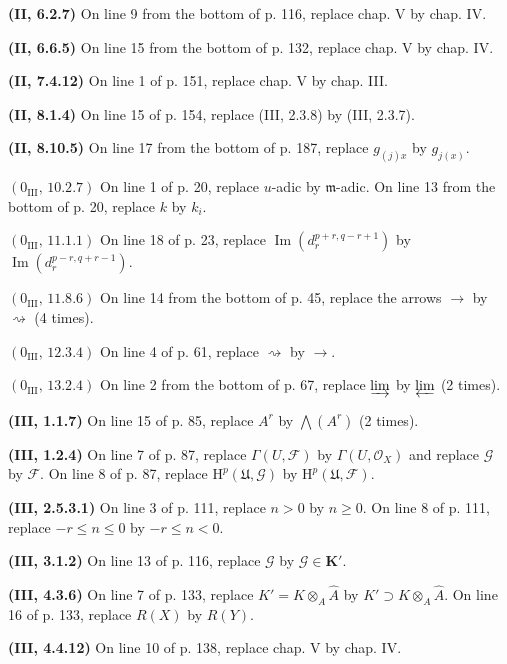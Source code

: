 \documentclass[10pt,oneside]{book}
\newcommand{\sh}[1]{\mathscr{#1}}
\newcommand{\HH}{\mathrm H}
\begin{document}
\noindent\textbf{(II, 6.2.7)} On line 9 from the bottom of p. 116, replace
chap. V by chap. IV.

\noindent\textbf{(II, 6.6.5)} On line 15 from the bottom of p. 132, replace
chap. V by chap. IV.

\noindent\textbf{(II, 7.4.12)} On line 1 of p. 151, replace chap. V by chap.
III.

\noindent\textbf{(II, 8.1.4)} On line 15 of p. 154, replace (III, 2.3.8) by
(III, 2.3.7).

\noindent\textbf{(II, 8.10.5)} On line 17 from the bottom of p. 187, replace
$g_{(j)x}$ by $g_{j(x)}$.

\noindent\textbf{$(0_{\mathrm{III}},\,10.2.7)$} On line 1 of p. 20, replace
$u$-adic by $\mathfrak m$-adic. On line 13 from the bottom of p. 20, replace
$k$ by $k_i$.

\noindent\textbf{$(0_{\mathrm{III}},\,11.1.1)$} On line 18 of p. 23, replace
$\operatorname{Im}(d_r^{p+r,q-r+1})$ by
$\operatorname{Im}(d_r^{p-r,q+r-1})$.

\noindent\textbf{$(0_{\mathrm{III}},\,11.8.6)$} On line 14 from the bottom of
p. 45, replace the arrows $\to$ by $\rightsquigarrow$ (4 times).

\noindent\textbf{$(0_{\mathrm{III}},\,12.3.4)$} On line 4 of p. 61, replace
$\rightsquigarrow$ by $\to$.

\noindent\textbf{$(0_{\mathrm{III}},\,13.2.4)$} On line 2 from the bottom of
p. 67, replace $\varinjlim$ by $\varprojlim$ (2 times).

\noindent\textbf{(III, 1.1.7)} On line 15 of p. 85, replace $A^r$ by
$\bigwedge(A^r)$ (2 times).

\noindent\textbf{(III, 1.2.4)} On line 7 of p. 87, replace
$\Gamma(U,\sh{F})$ by $\Gamma(U,\sh{O}_X)$ and replace $\sh{G}$ by $\sh{F}$.
On line 8 of p. 87, replace $\HH^p(\mathfrak U,\sh{G})$ by
$\HH^p(\mathfrak U,\sh{F})$.

\noindent\textbf{(III, 2.5.3.1)} On line 3 of p. 111, replace $n>0$ by
$n\geq0$. On line 8 of p. 111, replace $-r\leq n\leq0$ by $-r\leq n<0$.

\noindent\textbf{(III, 3.1.2)} On line 13 of p. 116, replace $\sh{G}$ by
$\sh{G}\in\mathbf K'$.

\noindent\textbf{(III, 4.3.6)} On line 7 of p. 133, replace
$K'=K\otimes_A\widehat A$ by $K'\supset K\otimes_A\widehat A$. On line 16 of
p. 133, replace $R(X)$ by $R(Y)$.

\noindent\textbf{(III, 4.4.12)} On line 10 of p. 138, replace chap. V by
chap. IV.
\end{document}
